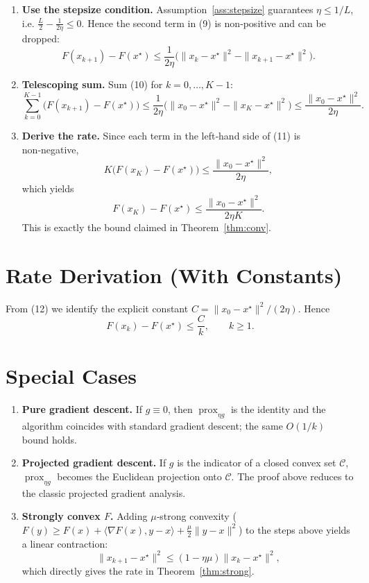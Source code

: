 \documentclass{article}
\begin{document}
\begin{enumerate}[label=[Step \arabic*], leftmargin=*]
\item \textbf{Use the stepsize condition.}  
Assumption~\ref{ass:stepsize} guarantees $\eta\le 1/L$, i.e. $\frac{L}{2}-\frac{1}{2\eta}\le0$. Hence the second term in (9) is non‑positive and can be dropped:
\[
F(x_{k+1})-F(x^{\star})\le \frac{1}{2\eta}\bigl(\|x_{k}-x^{\star}\|^{2}-\|x_{k+1}-x^{\star}\|^{2}\bigr).\tag{10}
\]

\item \textbf{Telescoping sum.}  
Sum (10) for $k=0,\dots, K-1$:
\[
\sum_{k=0}^{K-1}\bigl(F(x_{k+1})-F(x^{\star})\bigr)
\le\frac{1}{2\eta}\bigl(\|x_{0}-x^{\star}\|^{2}-\|x_{K}-x^{\star}\|^{2}\bigr)
\le\frac{\|x_{0}-x^{\star}\|^{2}}{2\eta}.
\tag{11}
\]

\item \textbf{Derive the rate.}  
Since each term in the left‑hand side of (11) is non‑negative,
\[
K\bigl(F(x_{K})-F(x^{\star})\bigr)\le\frac{\|x_{0}-x^{\star}\|^{2}}{2\eta},
\]
which yields
\[
F(x_{K})-F(x^{\star})\le\frac{\|x_{0}-x^{\star}\|^{2}}{2\eta K}.
\tag{12}
\]
This is exactly the bound claimed in Theorem~\ref{thm:conv}.
\end{enumerate}

\section*{Rate Derivation (With Constants)}
From (12) we identify the explicit constant $C=\|x_{0}-x^{\star}\|^{2}/(2\eta)$. Hence
\[
F(x_{k})-F(x^{\star})\le\frac{C}{k},\qquad k\ge1.
\]

\section*{Special Cases}
\begin{enumerate}[label=\arabic*.]
\item \textbf{Pure gradient descent.} If $g\equiv0$, then $\operatorname{prox}_{\eta g}$ is the identity and the algorithm coincides with standard gradient descent; the same $O(1/k)$ bound holds.
\item \textbf{Projected gradient descent.} If $g$ is the indicator of a closed convex set $\mathcal{C}$, $\operatorname{prox}_{\eta g}$ becomes the Euclidean projection onto $\mathcal{C}$. The proof above reduces to the classic projected gradient analysis.
\item \textbf{Strongly convex $F$.} Adding $\mu$‑strong convexity ($F(y)\ge F(x)+\langle\nabla F(x),y-x\rangle+\frac{\mu}{2}\|y-x\|^{2}$) to the steps above yields a linear contraction:
\[
\|x_{k+1}-x^{\star}\|^{2}\le(1-\eta\mu)\|x_{k}-x^{\star}\|^{2},
\]
which directly gives the rate in Theorem~\ref{thm:strong}.
\end{enumerate}
\end{document}
